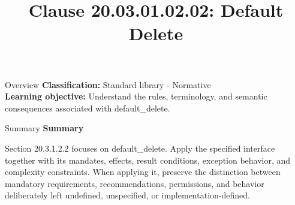 \documentclass[10pt,letterpaper]{article}
\title{Clause 20.03.01.02.02: Default Delete}
\author{}
\date{}
\begin{document}
\maketitle
\begin{CornellOverviewBox}{Overview}
\textbf{Classification:} Standard library - Normative\\[2pt]
\textbf{Learning objective:} Understand the rules, terminology, and semantic consequences associated with default\_delete.
\end{CornellOverviewBox}\begin{CornellSummaryBox}{Summary}
{\sffamily\bfseries\color{Accent} Summary}\par\vspace{3pt}Section 20.3.1.2.2 focuses on default\_delete. Apply the specified interface together with its mandates, effects, result conditions, exception behavior, and complexity constraints. When applying it, preserve the distinction between mandatory requirements, recommendations, permissions, and behavior deliberately left undefined, unspecified, or implementation-defined.
\end{CornellSummaryBox}
\end{document}
